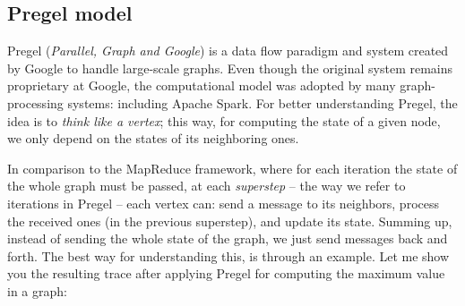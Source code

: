 \subsection{Pregel model}

Pregel (\textit{Parallel, Graph and Google}) is a data flow paradigm and system created by Google to handle large-scale graphs. Even though the original system remains proprietary at Google, the computational model was adopted by many graph-processing systems: including Apache Spark. For better understanding Pregel, the idea is to \textit{think like a vertex}; this way, for computing the state of a given node, we only depend on the states of its neighboring ones.

In comparison to the MapReduce framework, where for each iteration the state of the whole graph must be passed, at each \textit{superstep} -- the way we refer to iterations in Pregel -- each vertex can: send a message to its neighbors, process the received ones (in the previous superstep), and update its state. Summing up, instead of sending the whole state of the graph, we just send messages back and forth. The best way for understanding this, is through an example. Let me show you the resulting trace after applying Pregel for computing the maximum value in a graph:


